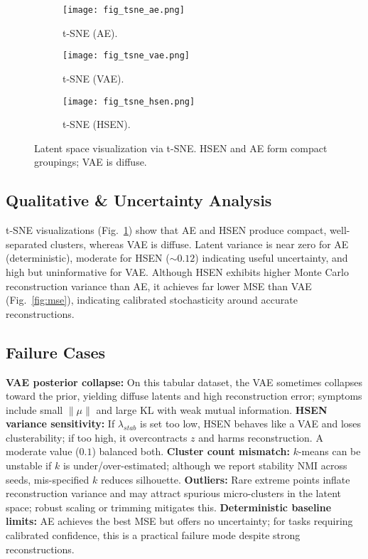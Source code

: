 \documentclass[12pt,a4paper]{article}
\begin{document}
\begin{figure}[h!]
  \centering
  \begin{subfigure}{0.32\linewidth}
    \centering
    \texttt{[image: fig\_tsne\_ae.png]}
    \caption{t-SNE (AE).}
  \end{subfigure}
  \begin{subfigure}{0.32\linewidth}
    \centering
    \texttt{[image: fig\_tsne\_vae.png]}
    \caption{t-SNE (VAE).}
  \end{subfigure}
  \begin{subfigure}{0.32\linewidth}
    \centering
    \texttt{[image: fig\_tsne\_hsen.png]}
    \caption{t-SNE (HSEN).}
  \end{subfigure}
  \caption{Latent space visualization via t-SNE. HSEN and AE form compact groupings; VAE is diffuse.}
  \label{fig:tsne}
\end{figure}

\FloatBarrier 

\subsection{Qualitative \& Uncertainty Analysis}
t-SNE visualizations (Fig.~\ref{fig:tsne}) show that AE and HSEN produce compact, well-separated clusters, whereas VAE is diffuse. Latent variance is near zero for AE (deterministic), moderate for HSEN ($\sim 0.12$) indicating useful uncertainty, and high but uninformative for VAE. Although HSEN exhibits higher Monte Carlo reconstruction variance than AE, it achieves far lower MSE than VAE (Fig.~\ref{fig:mse}), indicating calibrated stochasticity around accurate reconstructions.

\subsection{Failure Cases}
\label{subsec:failure-cases}
\textbf{VAE posterior collapse:}
On this tabular dataset, the VAE sometimes collapses toward the prior, yielding diffuse latents and high reconstruction error; symptoms include small $\|\mu\|$ and large KL with weak mutual information.
\textbf{HSEN variance sensitivity:}
If $\lambda_{stab}$ is set too low, HSEN behaves like a VAE and loses clusterability; if too high, it overcontracts $z$ and harms reconstruction. A moderate value (\(0.1\)) balanced both.
\textbf{Cluster count mismatch:}
$k$-means can be unstable if $k$ is under/over-estimated; although we report stability NMI across seeds, mis-specified $k$ reduces silhouette.
\textbf{Outliers:}
Rare extreme points inflate reconstruction variance and may attract spurious micro-clusters in the latent space; robust scaling or trimming mitigates this.
\textbf{Deterministic baseline limits:}
AE achieves the best MSE but offers no uncertainty; for tasks requiring calibrated confidence, this is a practical failure mode despite strong reconstructions.
\end{document}

